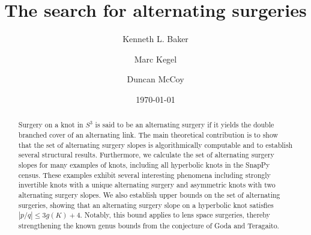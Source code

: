 \documentclass{amsart} %
\theoremstyle{thm}
\theoremstyle{definition}
\numberwithin{equation}{section}
\begin{document}

\title{The search for alternating surgeries} 

\author{Kenneth L. Baker}
\address{Department of Mathematics, University of Miami, Coral Gables, FL 33146, USA}

\author{Marc Kegel}
\address{Universidad de Sevilla, Dpto.\ de Álgebra,
Avda.\ Reina Mercedes s/n,
41012 Sevilla}

\author{Duncan McCoy}
\address{D\'{e}partment de Math\'{e}matiques, Universit\'{e} du Qu\'{e}bec \`{a} Montr\'{e}al, Canada}



\date{\today} %

\begin{abstract}
Surgery on a knot in $S^3$ is said to be an alternating surgery if it yields the double branched cover of an alternating link. The main theoretical contribution is to show that the set of alternating surgery slopes is algorithmically computable and to establish several structural results. Furthermore, we calculate the set of alternating surgery slopes for many examples of knots, including all hyperbolic knots in the SnapPy census. These examples exhibit several interesting phenomena including strongly invertible knots with a unique alternating surgery and asymmetric knots with two alternating surgery slopes.
We also establish upper bounds on the set of alternating surgeries, showing that an alternating surgery slope on a hyperbolic knot satisfies $|p/q|\leq 3g(K)+4$. Notably, this bound applies to lens space surgeries, thereby strengthening the known genus bounds from the conjecture of Goda and Teragaito.
\end{abstract}



\makeatletter
{}
\makeatother%



\maketitle
\setcounter{tocdepth}{1}
\tableofcontents
\end{document}
